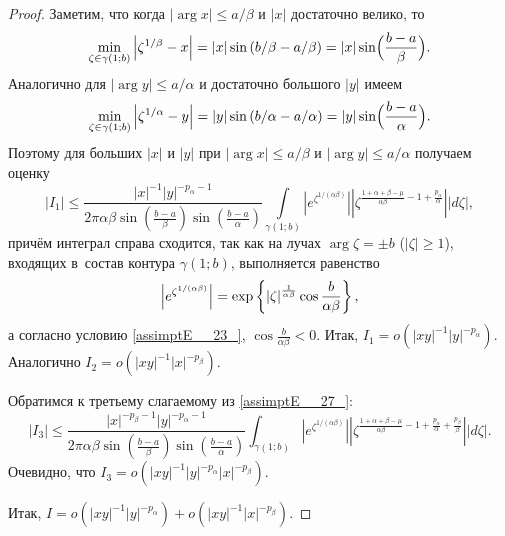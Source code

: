 {\begin{proof}
Заметим,  что когда $|\arg x|\le a/\beta $ и $|x|$ достаточно велико, то 
\begin{equation*}
\min\limits_{\zeta \in \gamma (1; b)} \left|\zeta ^{1/\beta} -x\right|=|x|\sin \left(b/\beta -a/\beta  \right)=|x|\sin \Bigl(\frac{b-a}{\beta } \Bigr).
\end{equation*}
Аналогично для $|\arg y|\le a/\alpha  $ и достаточно большого $|y|$ имеем
\begin{equation*}
\min\limits_{\zeta \in \gamma (1; b)} \left|\zeta ^{1/ \alpha}  -y\right|=|y|\sin \left(b/\alpha -a/\alpha  \right)=|y|\sin \Bigl(\frac{b-a}{\alpha } \Bigr).
\end{equation*} 
Поэтому для больших $|x|$ и $|y|$ при $|\arg x|\le a/\beta $ и $\left|\arg y\right|\le a/\alpha  $ получаем оценку
\begin{equation*}
\left|I_{1} \right|\le \frac{|x|^{-1} |y|^{-p_{\alpha } -1} }{2\pi \alpha \beta \sin \left(\frac{b-a}{\beta } \right)\sin \left(\frac{b-a}{\alpha } \right)} \int\limits_{\gamma (1; b)}\left|e^{\zeta ^{1/(\alpha \beta)} }   \right|\left|\zeta ^{\frac{1+\alpha +\beta -\mu }{\alpha \beta } -1+\frac{p_{\alpha } }{\alpha } } \right|\left|d\zeta \right|,
\end{equation*}
причём интеграл справа сходится, так как на лучах
$\arg \zeta =\pm b$ ($|\zeta |\ge 1$), входящих в~состав контура $\gamma (1; b)$, выполняется равенство
\begin{equation*}
\Bigl|e^{\zeta ^{1/(\alpha \beta)} }   \Bigr|=\exp \left\{\left|\zeta \right|^{\frac{1}{\alpha \beta } } \cos \frac{b}{\alpha \beta } \right\},
\end{equation*}
а  согласно условию \eqref{assimptE__23_}, $\cos \frac{b}{\alpha \beta } <0$.
Итак, $I_{1} =o\left(|xy|^{-1}|y|^{-p_\alpha}\right)$. 
Аналогично $I_{2} =o\left(|xy|^{-1}|x|^{-p_\beta}\right)$.

Обратимся к третьему слагаемому из \eqref{assimptE__27_}:
\begin{equation*}
\left|I_{3} \right|\le \frac{|x|^{-p_{\beta } -1} |y|^{-p_{\alpha } -1} }{2\pi \alpha \beta \sin \left(\frac{b-a}{\beta } \right)\sin \left(\frac{b-a}{\alpha } \right)} \int _{\gamma (1; b)}\left|e^{\zeta ^{1/(\alpha \beta)} }   \right|\left|\zeta ^{\frac{1+\alpha +\beta -\mu }{\alpha \beta } -1+\frac{p_{\alpha } }{\alpha } +\frac{p_{\beta } }{\beta } } \right|\left|d\zeta \right|.
\end{equation*}
Очевидно, что $I_{3} =o\left(|xy|^{-1}|y|^{-p_\alpha}|x|^{-p_\beta}\right)$.

Итак, $I=o\left(|xy|^{-1}|y|^{-p_\alpha}\right) + o\left(|xy|^{-1}|x|^{-p_\beta}\right)$.


\end{proof}}
